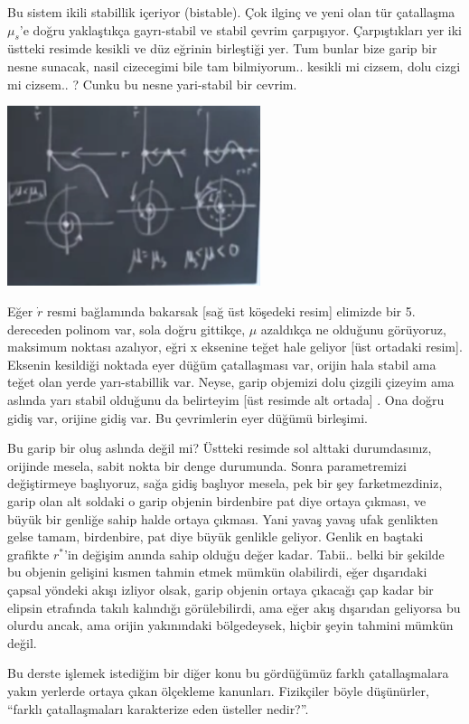 \documentclass[12pt,fleqn]{article}\usepackage{../../common}
\begin{document}
Bu sistem ikili stabillik içeriyor (bistable). Çok ilginç ve yeni olan tür
çatallaşma $\mu_s$'e doğru yaklaştıkça gayrı-stabil ve stabil çevrim
çarpışıyor. Çarpıştıkları yer iki üstteki resimde kesikli ve düz eğrinin
birleştiği yer. Tum bunlar bize garip bir nesne sunacak, nasil cizecegimi
bile tam bilmiyorum.. kesikli mi cizsem, dolu cizgi mi cizsem.. ? Cunku bu
nesne yari-stabil bir cevrim. 

\includegraphics[width=20em]{14_06.png}

Eğer $\dot{r}$ resmi bağlamında bakarsak [sağ üst köşedeki resim] elimizde
bir 5. dereceden polinom var, sola doğru gittikçe, $\mu$ azaldıkça ne
olduğunu görüyoruz, maksimum noktası azalıyor, eğri x eksenine teğet hale
geliyor [üst ortadaki resim]. Eksenin kesildiği noktada eyer düğüm
çatallaşması var, orijin hala stabil ama teğet olan yerde yarı-stabillik
var. Neyse, garip objemizi dolu çizgili çizeyim ama aslında yarı stabil
olduğunu da belirteyim [üst resimde alt ortada] . Ona doğru gidiş var,
orijine gidiş var. Bu çevrimlerin eyer düğümü birleşimi. 

Bu garip bir oluş aslında değil mi? Üstteki resimde sol alttaki
durumdasınız, orijinde mesela, sabit nokta bir denge durumunda. Sonra
parametremizi değiştirmeye başlıyoruz, sağa gidiş başlıyor mesela, pek bir
şey farketmezdiniz, garip olan alt soldaki o garip objenin birdenbire pat
diye ortaya çıkması, ve büyük bir genliğe sahip halde ortaya çıkması. Yani
yavaş yavaş ufak genlikten gelse tamam, birdenbire, pat diye büyük genlikle
geliyor. Genlik en baştaki grafikte $r^*$'in değişim anında sahip olduğu
değer kadar. Tabii.. belki bir şekilde bu objenin gelişini kısmen tahmin
etmek mümkün olabilirdi, eğer dışarıdaki çapsal yöndeki akışı izliyor
olsak, garip objenin ortaya çıkacağı çap kadar bir elipsin etrafında takılı
kalındığı görülebilirdi, ama eğer akış dışarıdan geliyorsa bu olurdu ancak,
ama orijin yakınındaki bölgedeysek, hiçbir şeyin tahmini mümkün değil.

Bu derste işlemek istediğim bir diğer konu bu gördüğümüz farklı
çatallaşmalara yakın yerlerde ortaya çıkan ölçekleme kanunları. Fizikçiler
böyle düşünürler, ``farklı çatallaşmaları karakterize eden üsteller
nedir?''. 
\end{document}
